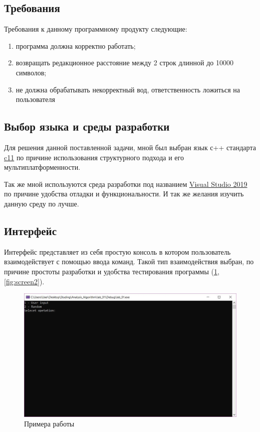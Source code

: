 \documentclass[a4paper, 14pt]{article}
\begin{document}
	\subsection{Требования}
	
	Требования к данному программному продукту следующие:
	\begin{enumerate}
		\item программа должна корректно работать;
		\item возвращать редакционное расстояние между 2 строк длинной до 10000 символов;
		\item не должна обрабатывать некорректный вод, ответственность ложиться на пользователя 
	\end{enumerate}

	\subsection{Выбор языка и среды разработки}
	
	Для решения данной поставленной задачи, мной был выбран язык с++ стандарта  \href{http://www.open-std.org/jtc1/sc22/wg14/www/docs/n1548.pdf}{c11} по причине использования структурного подхода и его мультиплатформенности.
	
	Так же мной используются среда разработки под названием \href{https://visualstudio.microsoft.com/ru/vs/}{Visual Studio 2019} по причине удобства отладки и функциональности. И так же желания изучить данную среду по лучше.
	
	\subsection{Интерфейс}
	
	Интерфейс представляет из себя простую консоль в котором пользователь взаимодействует с помощью ввода команд. Такой тип взаимодействия выбран, по причине простоты разработки и удобства тестирования программы (\ref{fig:screen1}, \ref{fig:screen2}).
	
	\begin{figure}[!h]
		\centering
		\includegraphics[width=0.7\linewidth]{img/screen1}
		\caption{Примера работы}
		\label{fig:screen1}
	\end{figure}
	
\end{document}

